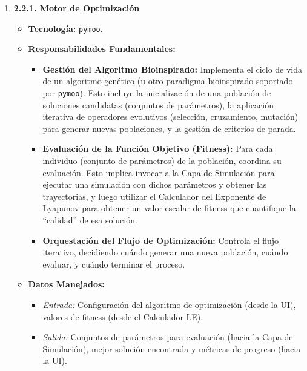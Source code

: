 \begin{enumerate} %
    \item \textbf{2.2.1. Motor de Optimización}
    \begin{itemize}
        \item \textbf{Tecnología:} \texttt{pymoo}.
        \item \textbf{Responsabilidades Fundamentales:}
        \begin{itemize}
            \item \textbf{Gestión del Algoritmo Bioinspirado:} Implementa el ciclo de vida de un algoritmo genético (u otro paradigma bioinspirado soportado por \texttt{pymoo}). Esto incluye la inicialización de una población de soluciones candidatas (conjuntos de parámetros), la aplicación iterativa de operadores evolutivos (selección, cruzamiento, mutación) para generar nuevas poblaciones, y la gestión de criterios de parada.
            \item \textbf{Evaluación de la Función Objetivo (Fitness):} Para cada individuo (conjunto de parámetros) de la población, coordina su evaluación. Esto implica invocar a la Capa de Simulación para ejecutar una simulación con dichos parámetros y obtener las trayectorias, y luego utilizar el Calculador del Exponente de Lyapunov para obtener un valor escalar de fitness que cuantifique la ``calidad'' de esa solución.
            \item \textbf{Orquestación del Flujo de Optimización:} Controla el flujo iterativo, decidiendo cuándo generar una nueva población, cuándo evaluar, y cuándo terminar el proceso.
        \end{itemize}
        \item \textbf{Datos Manejados:}
        \begin{itemize}
            \item \textit{Entrada:} Configuración del algoritmo de optimización (desde la UI), valores de fitness (desde el Calculador LE).
            \item \textit{Salida:} Conjuntos de parámetros para evaluación (hacia la Capa de Simulación), mejor solución encontrada y métricas de progreso (hacia la UI).
        \end{itemize}
    \end{itemize}


\end{enumerate}
